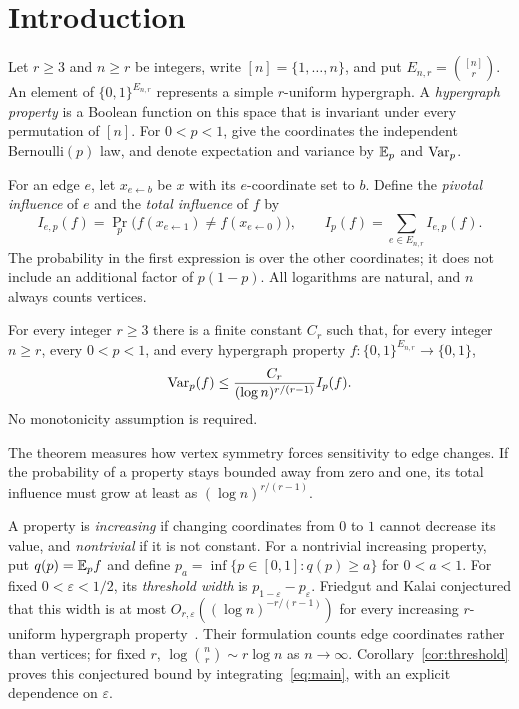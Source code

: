 \section{Introduction}
\label{sec:introduction}

Let $r\ge3$ and $n\ge r$ be integers, write $[n]=\{1,\ldots,n\}$,
and put $E_{n,r}=\binom{[n]}r$.
An element of $\{0,1\}^{E_{n,r}}$ represents a simple $r$-uniform
hypergraph. A \emph{hypergraph property} is a Boolean function on this
space that is invariant under every permutation of $[n]$.
For $0<p<1$, give the coordinates the independent Bernoulli$(p)$ law,
and denote expectation and variance by $\mathbb E_p$ and $\operatorname{Var}_p$.

For an edge $e$, let $x_{e\leftarrow b}$ be $x$ with its $e$-coordinate
set to $b$. Define the \emph{pivotal influence} of $e$ and the
\emph{total influence} of $f$ by
\[
 I_{e,p}(f)=\Pr_p\bigl(f(x_{e\leftarrow1})\ne
                         f(x_{e\leftarrow0})\bigr),
 \qquad I_p(f)=\sum_{e\in E_{n,r}}I_{e,p}(f).
\]
The probability in the first expression is over the other coordinates;
it does not include an additional factor of $p(1-p)$.
All logarithms are natural, and $n$ always counts vertices.

\begin{theorem}\label{thm:main}
For every integer $r\ge3$ there is a finite constant $C_r$ such that,
for every integer $n\ge r$, every $0<p<1$, and every hypergraph property
$f:\{0,1\}^{E_{n,r}}\to\{0,1\}$,
\begin{equation}\label{eq:main}
 \operatorname{Var}_p(f)\le \frac{C_r}{(\log n)^{r/(r-1)}}I_p(f).
\end{equation}
No monotonicity assumption is required.
\end{theorem}

The theorem measures how vertex symmetry forces sensitivity to edge
changes. If the probability of a property stays bounded away from
zero and one, its total influence must grow at least as
$(\log n)^{r/(r-1)}$.

A property is \emph{increasing} if changing coordinates from $0$ to
$1$ cannot decrease its value, and \emph{nontrivial} if it is not
constant. For a nontrivial increasing property, put $q(p)=\mathbb E_p f$
and define $p_a=\inf\{p\in[0,1]:q(p)\ge a\}$ for $0<a<1$.
For fixed $0<\varepsilon<1/2$, its \emph{threshold width} is
$p_{1-\varepsilon}-p_\varepsilon$.
Friedgut and Kalai conjectured that this width is at most
$O_{r,\varepsilon}((\log n)^{-r/(r-1)})$ for every increasing
$r$-uniform hypergraph property~\cite[Section~5, p.~2999]{FK96}.
Their formulation counts edge coordinates rather than vertices;
for fixed $r$, $\log\binom nr\sim r\log n$ as $n\to\infty$.
Corollary~\ref{cor:threshold} proves this conjectured bound by
integrating~\eqref{eq:main}, with an explicit dependence on
$\varepsilon$.

